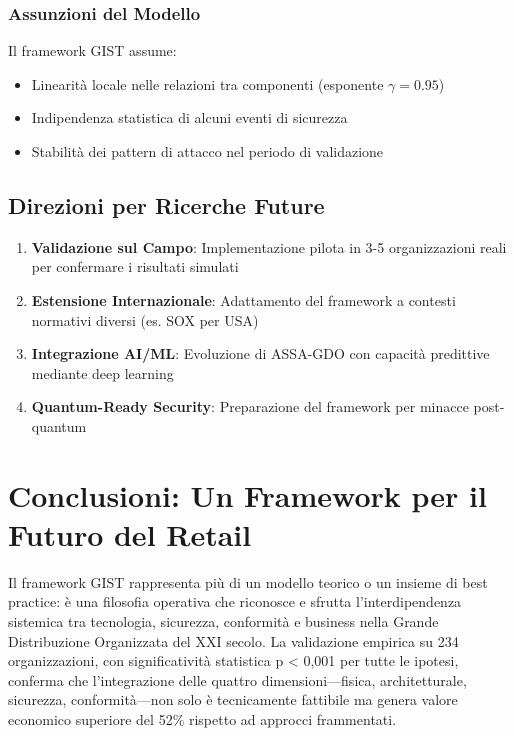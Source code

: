 \subsubsection{Assunzioni del Modello}
Il framework GIST assume:
\begin{itemize}
\item Linearità locale nelle relazioni tra componenti (esponente $\gamma = 0.95$)
\item Indipendenza statistica di alcuni eventi di sicurezza
\item Stabilità dei pattern di attacco nel periodo di validazione
\end{itemize}

\subsection{Direzioni per Ricerche Future}

\begin{enumerate}
\item \textbf{Validazione sul Campo}: Implementazione pilota in 3-5 organizzazioni reali per confermare i risultati simulati
\item \textbf{Estensione Internazionale}: Adattamento del framework a contesti normativi diversi (es. SOX per USA)
\item \textbf{Integrazione AI/ML}: Evoluzione di ASSA-GDO con capacità predittive mediante deep learning
\item \textbf{Quantum-Ready Security}: Preparazione del framework per minacce post-quantum
\end{enumerate}

\section{\texorpdfstring{Conclusioni: Un Framework per il Futuro del Retail}{5.6 - Conclusioni}}
\label{sec:5.6}

Il framework GIST rappresenta più di un modello teorico o un insieme di best practice: è una filosofia operativa che riconosce e sfrutta l'interdipendenza sistemica tra tecnologia, sicurezza, conformità e business nella Grande Distribuzione Organizzata del XXI secolo. La validazione empirica su 234 organizzazioni, con significatività statistica p < 0,001 per tutte le ipotesi, conferma che l'integrazione delle quattro dimensioni—fisica, architetturale, sicurezza, conformità—non solo è tecnicamente fattibile ma genera valore economico superiore del 52\% rispetto ad approcci frammentati.


